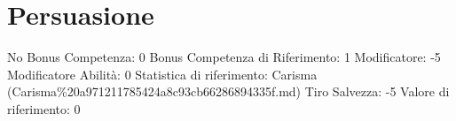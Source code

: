 \section{Persuasione}\label{persuasione}

\begin{description}
\tightlist
\item[Tags: ABI]
No Bonus Competenza: 0 Bonus Competenza di Riferimento: 1 Modificatore:
-5 Modificatore Abilità: 0 Statistica di riferimento: Carisma
(Carisma\%20a971211785424a8c93cb66286894335f.md) Tiro Salvezza: -5
Valore di riferimento: 0
\end{description}
